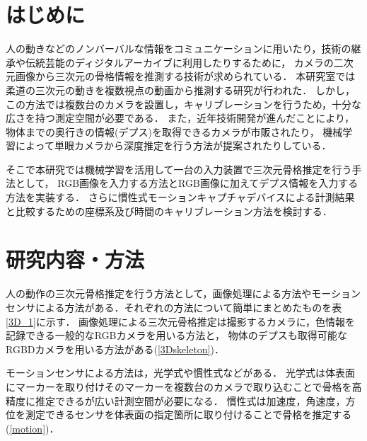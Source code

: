 \documentclass[a4j, fleqn, 12pt]{jsreport}
\begin{document}
\maketitle
\tableofcontents
\cleardoublepage
{}

\chapter{はじめに}
人の動きなどのノンバーバルな情報をコミュニケーションに用いたり，技術の継承や伝統芸能のディジタルアーカイブに利用したりするために，
カメラの二次元画像から三次元の骨格情報を推測する技術が求められている．
本研究室では柔道の三次元の動きを複数視点の動画から推測する研究\cite{turugi}が行われた．
しかし，この方法では複数台のカメラを設置し，キャリブレーションを行うため，十分な広さを持つ測定空間が必要である．
また，近年技術開発が進んだことにより，物体までの奥行きの情報(デプス)を取得できるカメラが市販されたり，
機械学習によって単眼カメラから深度推定を行う方法\cite{depth}が提案されたりしている．

そこで本研究では機械学習を活用して一台の入力装置で三次元骨格推定を行う手法として，
RGB画像を入力する方法とRGB画像に加えてデプス情報を入力する方法を実装する．
さらに慣性式モーションキャプチャデバイスによる計測結果と比較するための座標系及び時間のキャリブレーション方法を検討する．

\chapter{研究内容・方法}
人の動作の三次元骨格推定を行う方法として，画像処理による方法やモーションセンサによる方法がある．それぞれの方法について簡単にまとめたものを表\ref{3D_1}に示す．
画像処理による三次元骨格推定は撮影するカメラに，色情報を記録できる一般的なRGBカメラを用いる方法と，
物体のデプスも取得可能なRGBDカメラを用いる方法がある(\ref{3Dskeleton})．

モーションセンサによる方法は，光学式や慣性式などがある．
光学式は体表面にマーカーを取り付けそのマーカーを複数台のカメラで取り込むことで骨格を高精度に推定できるが広い計測空間が必要になる．
慣性式は加速度，角速度，方位を測定できるセンサを体表面の指定箇所に取り付けることで骨格を推定する(\ref{motion})．

\end{document}
